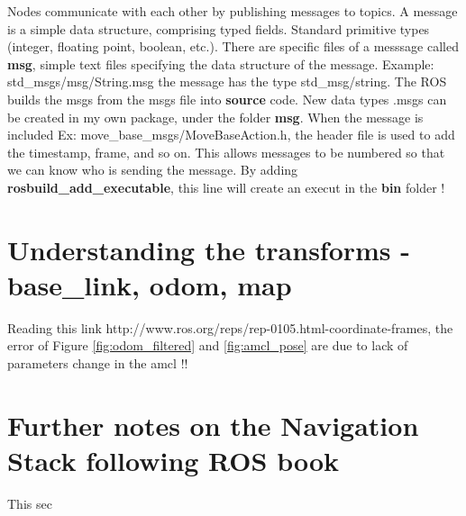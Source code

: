 \documentclass[11pt,a4paper]{article}
\begin{document}
Nodes communicate with each other by publishing messages to topics. A message is a simple data structure, comprising typed fields. Standard primitive types (integer, floating point, boolean, etc.). There are specific files of a messsage called \textbf{msg}, simple text files specifying the data structure of the message. Example: std{\_}msgs/msg/String.msg the message has the type std{\_}msg/string. The ROS builds the msgs from the msgs file into \textbf{source} code. New data types .msgs can be created in my own package, under the folder \textbf{msg}. When the message is included Ex: move{\_}base{\_}msgs/MoveBaseAction.h, the header file is used to add the timestamp, frame, and so on. This allows messages to be numbered so that we can know who is sending the message. By adding \textbf{rosbuild{\_}add{\_}executable}, this line will create an execut in the \textbf{bin} folder !
 
\section{Understanding the transforms - base{\_}link, odom, map}
Reading this link http://www.ros.org/reps/rep-0105.html-coordinate-frames, the error of Figure \ref{fig:odom_filtered} and \ref{fig:amcl_pose} are due to lack of parameters change in the amcl !!

\section{Further notes on the Navigation Stack following ROS book} 

This sec
\end{document}
